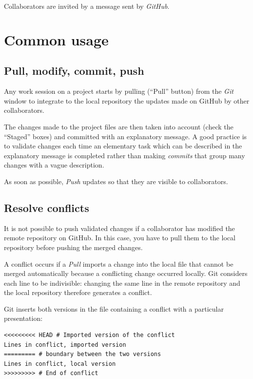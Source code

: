 \documentclass[
  12pt,
  american,
  a4paper,
  extrafontsizes,onecolumn,openright
  ]{memoir}
\begin{document}
\normalsize

Collaborators are invited by a message sent by \emph{GitHub}.

\hypertarget{common-usage}{%
\section{Common usage}\label{common-usage}}

\hypertarget{pull-modify-commit-push}{%
\subsection{Pull, modify, commit, push}\label{pull-modify-commit-push}}

Any work session on a project starts by pulling (\enquote{Pull} button) from the \emph{Git} window to integrate to the local repository the updates made on GitHub by other collaborators.

The changes made to the project files are then taken into account (check the \enquote{Staged} boxes) and committed with an explanatory message.
A good practice is to validate changes each time an elementary task which can be described in the explanatory message is completed rather than making \emph{commits} that group many changes with a vague description.

As soon as possible, \emph{Push} updates so that they are visible to collaborators.

\hypertarget{resolve-conflicts}{%
\subsection{Resolve conflicts}\label{resolve-conflicts}}

It is not possible to push validated changes if a collaborator has modified the remote repository on GitHub.
In this case, you have to pull them to the local repository before pushing the merged changes.

A conflict occurs if a \emph{Pull} imports a change into the local file that cannot be merged automatically because a conflicting change occurred locally.
Git considers each line to be indivisible: changing the same line in the remote repository and the local repository therefore generates a conflict.

Git inserts both versions in the file containing a conflict with a particular presentation:

\begin{verbatim}
<<<<<<<<< HEAD # Imported version of the conflict
Lines in conflict, imported version
========= # boundary between the two versions
Lines in conflict, local version
>>>>>>>>> # End of conflict
\end{verbatim}
\end{document}

